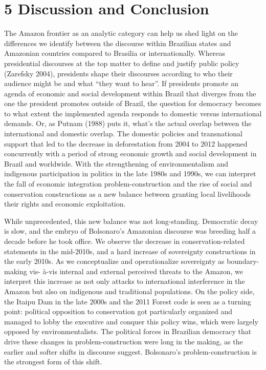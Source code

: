 \documentclass[
]{article}
\begin{document}
\hypertarget{discussion-and-conclusion}{%
\section{5 Discussion and Conclusion}\label{discussion-and-conclusion}}

The Amazon frontier as an analytic category can help us shed light on
the differences we identify between the discourse within Brazilian
states and Amazonian countries compared to Brasilia or internationally.
Whereas presidential discourses at the top matter to define and justify
public policy (Zarefsky 2004), presidents shape their discourses
according to who their audience might be and what ``they want to hear''.
If presidents promote an agenda of economic and social development
within Brazil that diverges from the one the president promotes outside
of Brazil, the question for democracy becomes to what extent the
implemented agenda responds to domestic versus international demands.
Or, as Putnam (1988) puts it, what's the actual overlap between the
international and domestic overlap. The domestic policies and
transnational support that led to the decrease in deforestation from
2004 to 2012 happened concurrently with a period of strong economic
growth and social development in Brazil and worldwide. With the
strengthening of environmentalism and indigenous participation in
politics in the late 1980s and 1990s, we can interpret the fall of
economic integration problem-construction and the rise of social and
conservation constructions as a new balance between granting local
livelihoods their rights and economic exploitation.

While unprecedented, this new balance was not long-standing. Democratic
decay is slow, and the embryo of Bolsonaro's Amazonian discourse was
breeding half a decade before he took office. We observe the decrease in
conservation-related statements in the mid-2010s, and a hard increase of
sovereignty constructions in the early 2010s. As we conceptualize and
operationalize sovereignty as boundary-making vis- à-vis internal and
external perceived threats to the Amazon, we interpret this increase as
not only attacks to international interference in the Amazon but also on
indigenous and traditional populations. On the policy side, the Itaipu
Dam in the late 2000s and the 2011 Forest code is seen as a turning
point: political opposition to conservation got particularly organized
and managed to lobby the executive and conquer this policy wins, which
were largely opposed by environmentalists. The political forces in
Brazilian democracy that drive these changes in problem-construction
were long in the making, as the earlier and softer shifts in discourse
suggest. Bolsonaro's problem-construction is the strongest form of this
shift.
\end{document}

